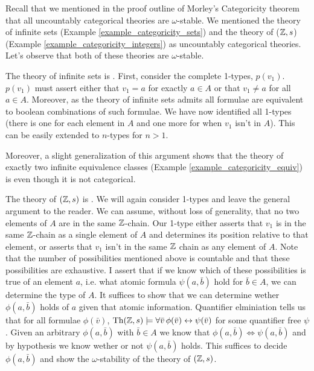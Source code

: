 Recall that we mentioned in the proof outline of Morley's Categoricity theorem that all uncountably categorical theories are \(\omega\)-stable. 
We mentioned the theory of infinite sets (Example \ref{example_categoricity_sets}) and the theory of (\(\mathbb{Z}, s\)) (Example \ref{example_categoricity_integers}) as uncountably categorical theories. 
Let's observe that both of these theories are \(\omega\)-stable. 

\begin{example}\label{example_omst_sets}
The theory of infinite sets is \omst. 
First, consider the complete 1-types, \(p(v_1)\). \(p(v_1)\) must assert either that \(v_1 = a\) for exactly \(a \in A\) or that \(v_1 \neq a\) for all \(a \in A\). 
Moreover, as the theory of infinite sets admits \qe \cite{mar} all formulae are equivalent to boolean combinations of such formulae. %
We have now identified all 1-types (there is one for each element in \(A\) and one more for when \(v_1\) isn't in \(A\)). 
This can be easily extended to \(n\)-types for \(n > 1\).

Moreover, a slight generalization of this argument shows that the theory of exactly two infinite equivalence classes (Example \ref{example_categoricity_equiv}) is \omst even though it is not categorical. 
\end{example}

\begin{example}\label{example_omst_Z}
The theory of \((\mathbb{Z}, s)\) is \omst. 
We will again consider 1-types and leave the general argument to the reader. 
We can assume, without loss of generality, that no two elements of \(A\) are in the same \(\mathbb{Z}\)-chain. 
Our 1-type either asserts that \(v_1\) is in the same \(\mathbb{Z}\)-chain as a single element of \(A\) and determines its position relative to that element, or asserts that \(v_1\) isn't in the same \(\mathbb{Z}\) chain as any element of \(A\). 
Note that the number of possibilities mentioned above is countable and that these possibilities are exhaustive.
I assert that if we know which of these possibilities is true of an element \(a\), i.e. what atomic formula \(\psi(a, \bar{b})\) hold for \(\bar{b} \in A\), we can determine the type of \(A\). 
It suffices to show that we can determine wether \(\phi(a, \bar{b})\) holds of \(a\) given that atomic information.  
Quantifier elminiation tells us that for all formulae \(\phi(\bar{v})\), \(\text{Th}(\mathbb{Z}, s) \models \forall \bar{v} \, \phi(\bar{v}) \leftrightarrow \psi(\bar{v})\) for some quantifier free \(\psi\).
Given an arbitrary \(\phi(a, \bar{b})\) with \(\bar{b} \in A\) we know that \(\phi(a, \bar{b}) \iff  \psi(a, \bar{b})\) and by hypothesis we know wether or not \(\psi(a, \bar{b})\) holds. 
This suffices to decide \(\phi(a, \bar{b})\) and show the \(\omega\)-stability of the theory of \((\mathbb{Z}, s)\).
\end{example}

